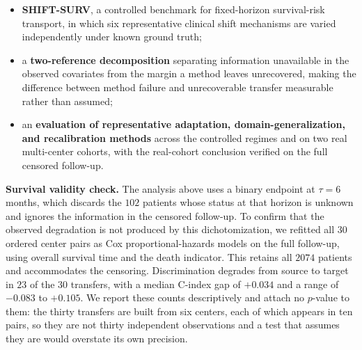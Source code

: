 \begin{itemize}
    \item \textbf{SHIFT-SURV}, a controlled benchmark for fixed-horizon
    survival-risk transport, in which six representative clinical shift
    mechanisms are varied independently under known ground truth;

    \item a \textbf{two-reference decomposition} separating information
    unavailable in the observed covariates from the margin a method leaves
    unrecovered, making the difference between method failure and unrecoverable
    transfer measurable rather than assumed;

    \item an \textbf{evaluation of representative adaptation,
    domain-generalization, and recalibration methods} across the controlled
    regimes and on two real multi-center cohorts, with the real-cohort
    conclusion verified on the full censored follow-up.
\end{itemize}



\textbf{Survival validity check.}
The analysis above uses a binary endpoint at $\tau=6$ months, which discards
the $102$ patients whose status at that horizon is unknown and ignores the
information in the censored follow-up. To confirm that the observed degradation
is not produced by this dichotomization, we refitted all $30$ ordered center
pairs as Cox proportional-hazards models on the full follow-up, using overall
survival time and the death indicator. This retains all $2074$ patients and
accommodates the censoring. Discrimination degrades from source to target in
$23$ of the $30$ transfers, with a median C-index gap of $+0.034$ and a range
of $-0.083$ to $+0.105$. We report these counts descriptively and attach no
$p$-value to them: the thirty transfers are built from six centers, each of
which appears in ten pairs, so they are not thirty independent observations and
a test that assumes they are would overstate its own precision.

